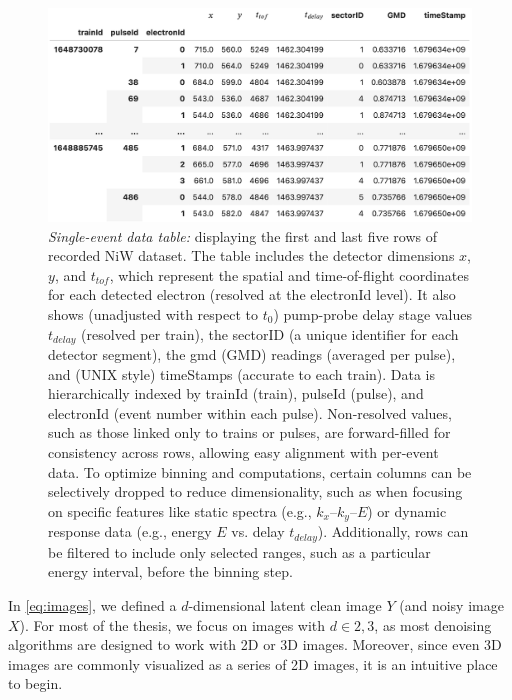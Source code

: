 \begin{figure}[h]
    \centering
    \includegraphics[width=1\linewidth]{images/dataframe.png}
    \caption{\textit{Single-event data table:} displaying the first and last five rows of recorded \gls{NiW} dataset. The table includes the detector dimensions $x$, $y$, and $t_{tof}$, which represent the spatial and time-of-flight coordinates for each detected electron (resolved at the electronId level). It also shows (unadjusted with respect to $t_0$) pump-probe delay stage values $t_{delay}$ (resolved per train), the sectorID (a unique identifier for each detector segment), the \gls{gmd} (GMD) readings (averaged per pulse), and (UNIX style) timeStamps (accurate to each train). Data is hierarchically indexed by trainId (\gls{train}), pulseId (\gls{pulse}), and electronId (event number within each pulse). Non-resolved values, such as those linked only to trains or pulses, are forward-filled for consistency across rows, allowing easy alignment with per-event data. To optimize binning and computations, certain columns can be selectively dropped to reduce dimensionality, such as when focusing on specific features like static spectra (e.g., $k_x$–$k_y$–$E$) or dynamic response data (e.g., energy $E$ vs. delay $t_{delay}$). Additionally, rows can be filtered to include only selected ranges, such as a particular energy interval, before the binning step.}
    \label{fig:df}
\end{figure}

In \cref{eq:images}, we defined a $d$-dimensional latent clean image $Y$ (and noisy image $X$). For most of the thesis, we focus on images with $d \in {2,3}$, as most denoising algorithms are designed to work with 2D or 3D images. Moreover, since even 3D images are commonly visualized as a series of 2D images, it is an intuitive place to begin. 

